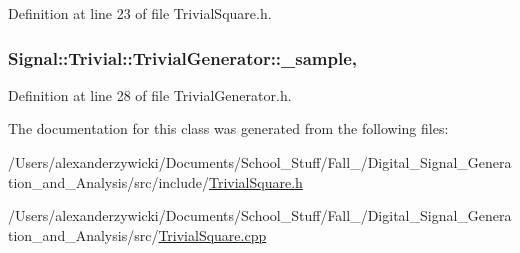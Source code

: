 Definition at line 23 of file Trivial\+Square.\+h.

\hypertarget{classSignal_1_1Trivial_1_1TrivialGenerator_a2e43e1ae605338b92e48974a681866e9}{
\subsubsection[{\+\_\+sample}]{ Signal\+::\+Trivial\+::\+Trivial\+Generator\+::\+\_\+sample\hspace{0.3cm}{\ttfamily [protected]}, {\ttfamily [inherited]}}}\label{classSignal_1_1Trivial_1_1TrivialGenerator_a2e43e1ae605338b92e48974a681866e9}


Definition at line 28 of file Trivial\+Generator.\+h.



The documentation for this class was generated from the following files\+:\begin{DoxyCompactItemize}
\item 
/\+Users/alexanderzywicki/\+Documents/\+School\+\_\+\+Stuff/\+Fall\+\_/\+Digital\+\_\+\+Signal\+\_\+\+Generation\+\_\+and\+\_\+\+Analysis/src/include/\hyperlink{TrivialSquare_8h}{Trivial\+Square.\+h}\item 
/\+Users/alexanderzywicki/\+Documents/\+School\+\_\+\+Stuff/\+Fall\+\_/\+Digital\+\_\+\+Signal\+\_\+\+Generation\+\_\+and\+\_\+\+Analysis/src/\hyperlink{TrivialSquare_8cpp}{Trivial\+Square.\+cpp}\end{DoxyCompactItemize}
